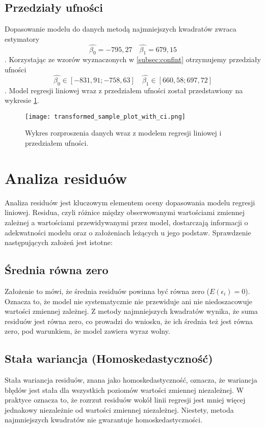 \documentclass{article}
\begin{document}
\subsection{Przedziały ufności}
Dopasowanie modelu do danych metodą najmniejszych kwadratów zwraca estymatory 
$$ \hat{\beta_0} = -795,27 \quad \hat{\beta_1} = 679,15 $$. 
Korzystając ze wzorów wyznaczonych w \ref{subsec:confint} otrzymujemy przedziały ufności
$$ \hat{\beta_0} \in [-831,91; -758,63] \quad \hat{\beta_1} \in [660,58; 697,72] $$. Model regresji liniowej wraz z przedziałem ufności został przedstawiony na wykresie \ref{fig:przedzialufnosci}.

\begin{figure}[!h]
  \centering
  \texttt{[image: transformed\_sample\_plot\_with\_ci.png]}
  \caption{Wykres rozproszenia danych wraz z modelem regresji liniowej i przedziałem ufności.}
  \label{fig:przedzialufnosci}
\end{figure}
\section{Analiza residuów} 
\label{sec:residuum}

Analiza residuów jest kluczowym elementem oceny dopasowania modelu regresji liniowej. Residua, czyli różnice między obserwowanymi wartościami zmiennej zależnej a wartościami przewidywanymi przez model, dostarczają informacji o adekwatności modelu oraz o założeniach leżących u jego podstaw. Sprawdzenie następujących założeń jest istotne:

\subsection{Średnia równa zero}
Założenie to mówi, że średnia residuów powinna być równa zero (\(E(\epsilon_i) = 0\)). Oznacza to, że model nie systematycznie nie przewiduje ani nie niedoszacowuje wartości zmiennej zależnej. Z metody najmniejszych kwadratów wynika, że suma residuów jest równa zero, co prowadzi do wniosku, że ich średnia też jest równa zero, pod warunkiem, że model zawiera wyraz wolny.

\subsection{Stała wariancja (Homoskedastyczność)}
Stała wariancja residuów, znana jako homoskedastyczność, oznacza, że wariancja błędów jest stała dla wszystkich poziomów wartości zmiennej niezależnej. W praktyce oznacza to, że rozrzut residuów wokół linii regresji jest mniej więcej jednakowy niezależnie od wartości zmiennej niezależnej. Niestety, metoda najmniejszych kwadratów nie gwarantuje homoskedastyczności.
\end{document}
